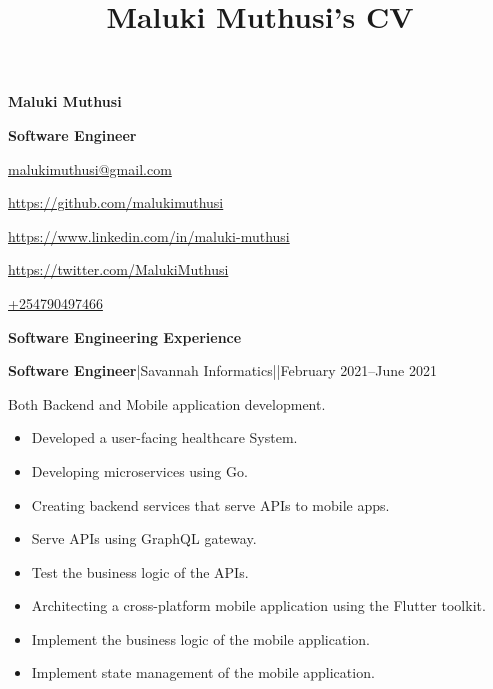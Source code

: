\documentclass[a4paper]{article}
\begin{document}
\title{Maluki Muthusi's CV}

\begin{center}
    {\Large \textbf{Maluki Muthusi}} \par

    {\large \textbf{Software Engineer}}
\end{center}

\begin{description}[noitemsep]
    \item[\textbf{Email:}]\href{mailto:malukimuthusi@gmail.com}{malukimuthusi@gmail.com}
    \item[\textbf{Github:}]\url{https://github.com/malukimuthusi}
    \item[\textbf{LinkedIn:}]\url{https://www.linkedin.com/in/maluki-muthusi}
    \item[\textbf{Twitter:}]\url{https://twitter.com/MalukiMuthusi}
    \item[\textbf{Contact:}]\url{+254790497466}
    \item[\textbf{Website: }\url{https://maluki.sharehen.com}]
\end{description}


\begin{center}
    {\Large \textbf{Software Engineering Experience}}
\end{center}

\textbf{Software Engineer}|Savannah Informatics||February 2021--June 2021

Both Backend and Mobile application development.

\begin{itemize}[noitemsep]
    \item Developed a user-facing healthcare System.
    \item Developing microservices using Go.
    \item Creating backend services that serve APIs to mobile apps.
    \item Serve APIs using GraphQL gateway.
    \item Test the business logic of the APIs.
    \item Architecting a cross-platform mobile application using the Flutter toolkit.
    \item Implement the business logic of the mobile application.
    \item Implement state management of the mobile application.

\end{itemize}
\end{document}
